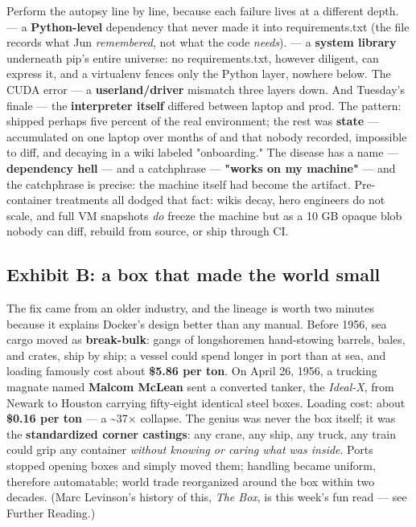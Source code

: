 Perform the autopsy line by line, because each failure lives at a different depth.  — a \textbf{Python-level} dependency that never made it into requirements.txt (the file records what Jun \textit{remembered}, not what the code \textit{needs}).  — a \textbf{system library} underneath pip's entire universe: no requirements.txt, however diligent, can express it, and a virtualenv fences only the Python layer, nowhere below. The CUDA error — a \textbf{userland/driver} mismatch three layers down. And Tuesday's finale — the \textbf{interpreter itself} differed between laptop and prod. The pattern:  shipped perhaps five percent of the real environment; the rest was \textbf{state} — accumulated on one laptop over months of  and  that nobody recorded, impossible to diff, and decaying in a wiki labeled "onboarding." The disease has a name — \textbf{dependency hell} — and a catchphrase — \textbf{"works on my machine"} — and the catchphrase is precise: the machine itself had become the artifact. Pre-container treatments all dodged that fact: wikis decay, hero engineers do not scale, and full VM snapshots \textit{do} freeze the machine but as a 10 GB opaque blob nobody can diff, rebuild from source, or ship through CI.

\subsection*{Exhibit B: a box that made the world small}

The fix came from an older industry, and the lineage is worth two minutes because it explains Docker's design better than any manual. Before 1956, sea cargo moved as \textbf{break-bulk}: gangs of longshoremen hand-stowing barrels, bales, and crates, ship by ship; a vessel could spend longer in port than at sea, and loading famously cost about \textbf{\$5.86 per ton}. On April 26, 1956, a trucking magnate named \textbf{Malcom McLean} sent a converted tanker, the \textit{Ideal-X}, from Newark to Houston carrying fifty-eight identical steel boxes. Loading cost: about \textbf{\$0.16 per ton} — a \textasciitilde{}37× collapse. The genius was never the box itself; it was the \textbf{standardized corner castings}: any crane, any ship, any truck, any train could grip any container \textit{without knowing or caring what was inside}. Ports stopped opening boxes and simply moved them; handling became uniform, therefore automatable; world trade reorganized around the box within two decades. (Marc Levinson's history of this, \textit{The Box}, is this week's fun read — see Further Reading.)

